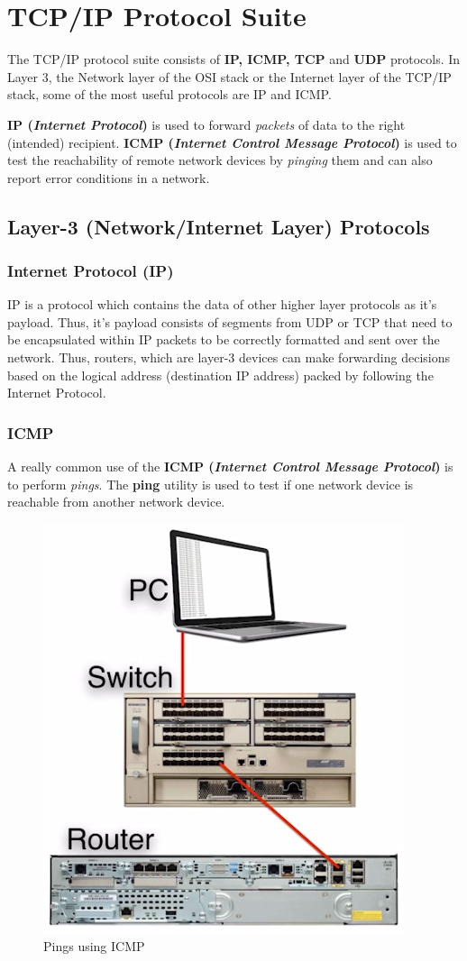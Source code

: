 \section{TCP/IP Protocol Suite}
The TCP/IP protocol suite consists of \textbf{IP, ICMP, TCP} and \textbf{UDP} protocols. In Layer 3, the Network layer of the OSI stack or the Internet layer of the TCP/IP stack, some of the most useful protocols are IP and ICMP.

\textbf{IP (\textit{Internet Protocol})} is used to forward \textit{packets} of data to the right (intended) recipient. \textbf{ICMP (\textit{Internet Control Message Protocol})} is used to test the reachability of remote network devices by \textit{pinging} them and can also report error conditions in a network. 

\subsection{Layer-3 (Network/Internet Layer) Protocols}
\subsubsection{Internet Protocol (IP)}
IP is a protocol which contains the data of other higher layer protocols as it's payload. Thus, it's payload consists of segments from UDP or TCP that need to be encapsulated within IP packets to be correctly formatted and sent over the network. Thus, routers, which are layer-3 devices can make forwarding decisions based on the logical address (destination IP address) packed by following the Internet Protocol. 

\subsubsection{ICMP}
A really common use of the \textbf{ICMP (\textit{Internet Control Message Protocol})} is to perform \textit{pings}. The \textbf{ping} utility is used to test if one network device is reachable from another network device. 

\begin{figure}[H]
	\centering
	\includegraphics[width=0.5\linewidth]{"Mod1/chapters/1.1.d ICMP example"}
	\caption{Pings using ICMP}
	\label{fig:1 Pings using ICMP}
\end{figure}


